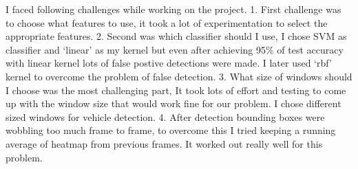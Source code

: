 \documentclass[11pt]{article}
\begin{document}
I faced following challenges while working on the project. 1. First
challenge was to choose what features to use, it took a lot of
experimentation to select the appropriate features. 2. Second was which
classifier should I use, I chose SVM as classifier and `linear' as my
kernel but even after achieving 95\% of test accuracy with linear kernel
lots of false postive detections were made. I later used `rbf' kernel to
overcome the problem of false detection. 3. What size of windows should
I choose was the most challenging part, It took lots of effort and
testing to come up with the window size that would work fine for our
problem. I chose different sized windows for vehicle detection. 4. After
detection bounding boxes were wobbling too much frame to frame, to
overcome this I tried keeping a running average of heatmap from previous
frames. It worked out really well for this problem.


    
    
    
    
\end{document}
